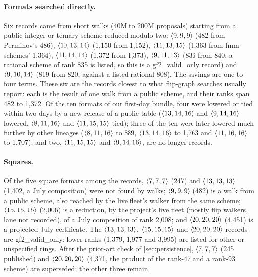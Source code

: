 \paragraph{Formats searched directly.}
Six records came from short walks (40M to 200M proposals) starting from a public integer or ternary scheme reduced modulo two: $\langle 9,9,9\rangle$ (482 from Perminov's 486), $\langle 10,13,14\rangle$ (1{,}150 from 1{,}152), $\langle 11,13,15\rangle$ (1{,}363 from fmm-schemes' 1{,}364), $\langle 11,14,14\rangle$ (1{,}372 from 1{,}373),
$\langle 9,11,13\rangle$ (836 from 840; a rational scheme of rank 835 is listed, so this is a \textsf{gf2\_valid\_only} record) and $\langle 9,10,14\rangle$ (819 from 820, against a listed rational 808). The savings are one to four terms.
These six are the records closest to what flip-graph searches usually report: each is the result of one walk from a public scheme, and their ranks span 482 to 1{,}372.
Of the ten formats of our first-day bundle, four were lowered or tied within two days by a new release of a public table ($\langle 13,14,16\rangle$ and $\langle 9,14,16\rangle$ lowered, $\langle 8,11,16\rangle$ and $\langle 11,15,15\rangle$ tied); three of the ten were later lowered much further by other lineages
($\langle 8,11,16\rangle$ to 889, $\langle 13,14,16\rangle$ to 1{,}763 and $\langle 11,16,16\rangle$ to 1{,}707); and two, $\langle 11,15,15\rangle$ and $\langle 9,14,16\rangle$, are no longer records.

\paragraph{Squares.}
Of the five square formats among the records, $\langle 7,7,7\rangle$ (247) and $\langle 13,13,13\rangle$ (1{,}402, a July composition) were not found by walks; $\langle 9,9,9\rangle$ (482) is a walk from a public scheme, also reached by the live fleet's walker from the same scheme; $\langle 15,15,15\rangle$ (2{,}006) is a reduction, by the project's live fleet (mostly flip walkers, lane not recorded), of a July composition of rank 2{,}008; and $\langle 20,20,20\rangle$ (4{,}451) is a projected July certificate. The $\langle 13,13,13\rangle$, $\langle 15,15,15\rangle$ and $\langle 20,20,20\rangle$ records are \textsf{gf2\_valid\_only}: lower ranks (1{,}379, 1{,}977 and 3{,}995) are listed for other or unspecified rings. After the prior-art check of \cref{sec:persistence}, $\langle 7,7,7\rangle$ (245 published) and $\langle 20,20,20\rangle$ (4{,}371, the product of the rank-47 and a rank-93 scheme) are superseded; the other three remain.

